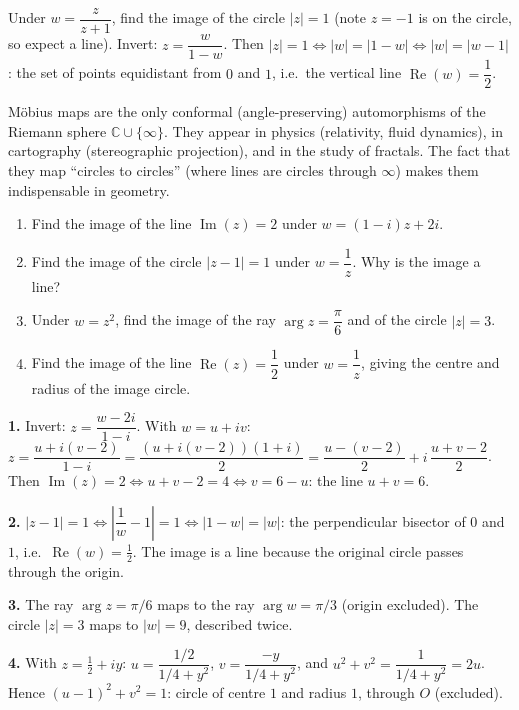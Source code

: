 \documentclass[11pt]{article}
\begin{document}
\begin{exemplebox}
Under $w = \dfrac{z}{z + 1}$, find the image of the circle $|z| = 1$ (note $z = -1$ is on the circle, so expect a line). Invert: $z = \dfrac{w}{1 - w}$. Then $|z| = 1 \iff |w| = |1 - w| \iff |w| = |w - 1|$: the set of points equidistant from $0$ and $1$, i.e.\ the vertical line $\operatorname{Re}(w) = \dfrac{1}{2}$.
\end{exemplebox}

\begin{savaistu}
Möbius maps are the only conformal (angle-preserving) automorphisms of the Riemann sphere $\mathbb{C} \cup \{\infty\}$. They appear in physics (relativity, fluid dynamics), in cartography (stereographic projection), and in the study of fractals. The fact that they map ``circles to circles'' (where lines are circles through $\infty$) makes them indispensable in geometry.
\end{savaistu}

\begin{exercice}[Practice]
\begin{enumerate}
\item Find the image of the line $\operatorname{Im}(z) = 2$ under $w = (1 - i)z + 2i$.
\item Find the image of the circle $|z - 1| = 1$ under $w = \dfrac{1}{z}$. Why is the image a line?
\item Under $w = z^2$, find the image of the ray $\arg z = \dfrac{\pi}{6}$ and of the circle $|z| = 3$.
\item Find the image of the line $\operatorname{Re}(z) = \dfrac{1}{2}$ under $w = \dfrac{1}{z}$, giving the centre and radius of the image circle.
\end{enumerate}
\end{exercice}

\begin{corrige}[Practice]
\textbf{1.} Invert: $z = \dfrac{w - 2i}{1 - i}$. With $w = u + iv$: $z = \dfrac{u + i(v-2)}{1-i} = \dfrac{(u + i(v-2))(1+i)}{2} = \dfrac{u - (v-2)}{2} + i\,\dfrac{u + v - 2}{2}$. Then $\operatorname{Im}(z) = 2 \iff u + v - 2 = 4 \iff v = 6 - u$: the line $u + v = 6$.

\textbf{2.} $|z - 1| = 1 \iff \left|\dfrac{1}{w} - 1\right| = 1 \iff |1 - w| = |w|$: the perpendicular bisector of $0$ and $1$, i.e.\ $\operatorname{Re}(w) = \tfrac12$. The image is a line because the original circle passes through the origin.

\textbf{3.} The ray $\arg z = \pi/6$ maps to the ray $\arg w = \pi/3$ (origin excluded). The circle $|z| = 3$ maps to $|w| = 9$, described twice.

\textbf{4.} With $z = \tfrac12 + iy$: $u = \dfrac{1/2}{1/4 + y^2}$, $v = \dfrac{-y}{1/4 + y^2}$, and $u^2 + v^2 = \dfrac{1}{1/4 + y^2} = 2u$. Hence $(u - 1)^2 + v^2 = 1$: circle of centre $1$ and radius $1$, through $O$ (excluded).
\end{corrige}
\end{document}
